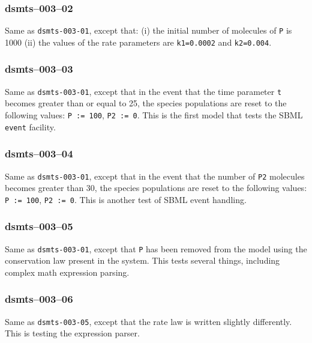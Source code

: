 
\subsubsection{dsmts--003--02} 

Same as \verb$dsmts-003-01$, except that: (i) the initial number of
molecules of \verb$P$ is 1000 (ii) the values of the rate parameters
are \verb$k1=0.0002$ and \verb$k2=0.004$. 


\subsubsection{dsmts--003--03} 

Same as \verb$dsmts-003-01$, except that in the event that the time
parameter \verb$t$ becomes greater than or equal to 25, the species
populations are reset to the following values: \verb$P := 100$,
\verb$P2 := 0$. This is the first model that tests the SBML
\verb$event$ facility.


\subsubsection{dsmts--003--04} 

Same as \verb$dsmts-003-01$, except that in the event that the number
of \verb$P2$ molecules becomes greater than 30, the species
populations are reset to the following values: \verb$P := 100$, 
\verb$P2 := 0$. This is another test of SBML event
handling.


\subsubsection{dsmts--003--05} 

Same as \verb$dsmts-003-01$, except that \verb$P$ has been removed
from the model using the conservation law present in the system. This
tests several things, including complex math expression
parsing.


\subsubsection{dsmts--003--06} 

Same as \verb$dsmts-003-05$, except that the rate law is written
slightly differently. This is testing the expression
parser.

